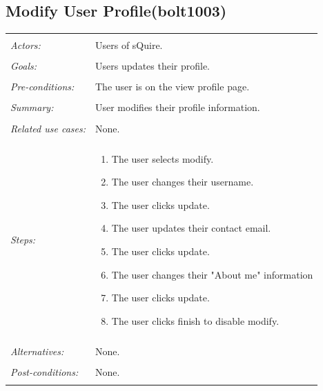 \documentclass[11pt]{report}
\begin{document}
\begin{IDE-like Features}
\begin{}
\begin{Collaborative features that would be "nice":}
\subsection{Modify User Profile(bolt1003)}
\begin{tabular}{ p{2cm} p{12cm} }
 \hline
 \\
 \textit{Actors:} & Users of sQuire. \\ 
 \\
 \textit{Goals:} & Users updates their profile. \\
 \\
 \textit{Pre-conditions:} & The user is on the view profile page. \\
 \\
 \textit{Summary:} & User modifies their profile information.\\ 
 \\
 \textit{Related use cases:} & None. \\ 
 \\
 \textit{Steps:} & \begin{enumerate}
  \item The user selects modify. 
  \item The user changes their username.
  \item The user clicks update.
  \item The user updates their contact email.
  \item The user clicks update.
  \item The user changes their "About me" information
  \item The user clicks update.
  \item The user clicks finish to disable modify.
 \end{enumerate} \\
 \\
 \textit{Alternatives:} & None. \\
 \\
 \textit{Post-conditions:} & None. \\
 \\
\hline
\end{tabular}


\end{Collaborative features that would be "nice":}
\end{}
\end{IDE-like Features}
\end{document}
